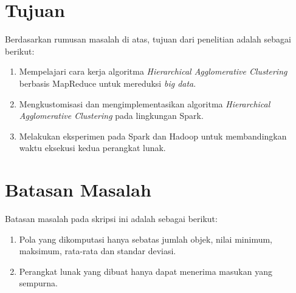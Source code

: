 \section{Tujuan}
\label{sec:tujuan}
Berdasarkan rumusan masalah di atas, tujuan dari penelitian adalah sebagai berikut:
\begin{enumerate}

\item Mempelajari cara kerja algoritma  {\it Hierarchical Agglomerative Clustering} berbasis MapReduce untuk mereduksi {\it big data}.

\item Mengkustomisasi dan mengimplementasikan algoritma {\it Hierarchical Agglomerative Clustering} pada lingkungan Spark.

\item Melakukan eksperimen pada Spark dan Hadoop untuk membandingkan waktu eksekusi kedua perangkat lunak.

\end{enumerate}



\section{Batasan Masalah}
\label{sec:batasan}
Batasan masalah pada skripsi ini adalah sebagai berikut:
\begin{enumerate}

\item Pola yang dikomputasi hanya sebatas jumlah objek, nilai minimum, maksimum, rata-rata dan standar deviasi.

\item Perangkat lunak yang dibuat hanya dapat menerima masukan yang sempurna.


\end{enumerate}


